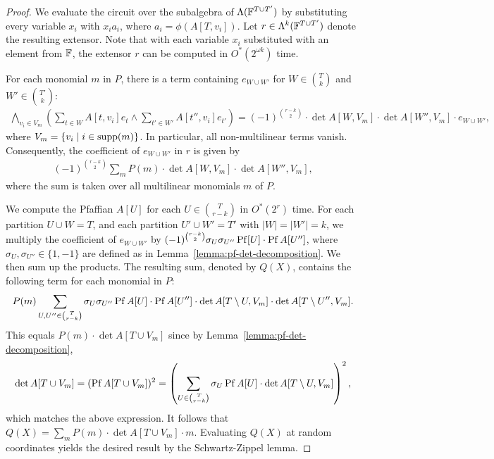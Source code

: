 \begin{proof}
We evaluate the circuit over the subalgebra of $\Lambda(\mathbb F^{T \cup T'})$ by substituting every variable $x_i$ with $x_i a_i$, where $a_i = \phi(A[T, v_i])$.
Let $r \in \Lambda^k(\mathbb F^{T \cup T'})$ denote the resulting extensor.
Note that with each variable $x_i$ substituted with an element from $\mathbb F$, the extensor $r$ can be computed in $O^*(2^{\omega k})$ time.

For each monomial $m$ in $P$, there is a term containing $e_{W \cup W'}$ for $W \in \binom{T}{k}$ and $W' \in \binom{T'}{k}$:
\begin{align*}
  \bigwedge_{v_i \in V_m} \left( \sum_{t \in W} A[t, v_i] e_t \wedge \sum_{t' \in W'} A[t'', v_i] e_{t'} \right)  = (-1)^{\binom{r - k}{2}} \cdot \det A[W, V_m] \cdot \det A[W'', V_m] \cdot e_{W \cup W'},
\end{align*}
where $V_m = \{ v_i \mid i \in \operatorname{supp}(m) \}$.
In particular, all non-multilinear terms vanish.
Consequently, the coefficient of $e_{W \cup W'}$ in $r$ is given by
\begin{align*}
  (-1)^{\binom{r-k}{2}} \sum_{m} P(m) \cdot \det A[W, V_m] \cdot \det A[W'', V_m],
\end{align*}
where the sum is taken over all multilinear monomials $m$ of $P$.

We compute the Pfaffian $A[U]$ for each $U \in \binom{T}{r-k}$ in $O^*(2^r)$ time.
For each partition $U \cup W = T$, and each partition $U' \cup W' = T'$ with $|W| = |W'| = k$, we multiply the coefficient of $e_{W \cup W'}$ by $(-1)^{\binom{r-k}{2}} \sigma_{U} \sigma_{U''} \operatorname{Pf} [U] \cdot \operatorname{Pf} A[U'']$, where $\sigma_U, \sigma_{U''} \in \{ 1, -1 \}$ are defined as in Lemma~\ref{lemma:pf-det-decomposition}.
We then sum up the products.
The resulting sum, denoted by $Q(X)$, contains the following term for each monomial in $P$:
\begin{align*}
  P(m) \sum_{U, U'' \in \binom{T}{r - k}} \sigma_U \sigma_{U''} \operatorname{Pf} A[U] \cdot \operatorname{Pf} A[U''] \cdot \det A[T \setminus U, V_m] \cdot \det A[T \setminus U'', V_m]. 
\end{align*}
This equals $P(m) \cdot \det A[T \cup V_m]$ since by Lemma~\ref{lemma:pf-det-decomposition}, 
\begin{align*}
  \det A[T \cup V_m] = (\operatorname{Pf} A[T \cup V_m])^2
  = \left( \sum_{U \in \binom{T}{r - k}} \sigma_U \operatorname{Pf} A[U] \cdot \det A[T \setminus U, V_m] \right)^2,
\end{align*}
which matches  the above expression.
It follows that $Q(X) = \sum_{m} P(m) \cdot \det A[T \cup V_m] \cdot m$.
Evaluating $Q(X)$ at random coordinates yields the desired result by the Schwartz-Zippel lemma.
\end{proof}

